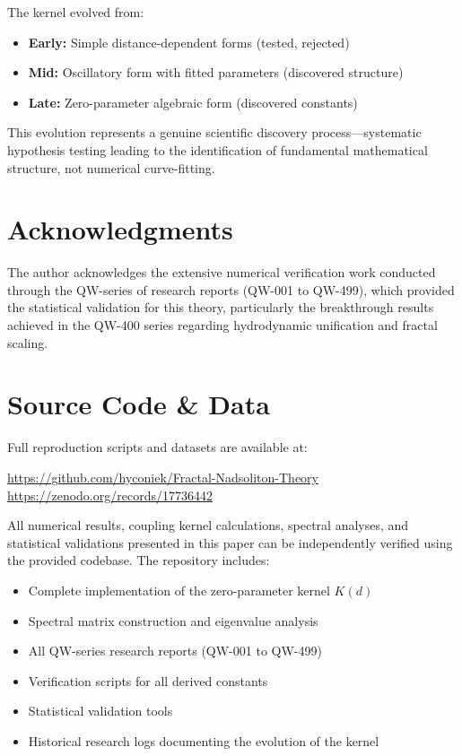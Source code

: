 \documentclass[11pt, a4paper]{article}
\begin{document}
The kernel evolved from:
\begin{itemize}
    \item \textbf{Early:} Simple distance-dependent forms (tested, rejected)
    \item \textbf{Mid:} Oscillatory form with fitted parameters (discovered structure)
    \item \textbf{Late:} Zero-parameter algebraic form (discovered constants)
\end{itemize}

This evolution represents a genuine scientific discovery process—systematic hypothesis testing leading to the identification of fundamental mathematical structure, not numerical curve-fitting.

\section*{Acknowledgments}

The author acknowledges the extensive numerical verification work conducted through the QW-series of research reports (QW-001 to QW-499), which provided the statistical validation for this theory, particularly the breakthrough results achieved in the QW-400 series regarding hydrodynamic unification and fractal scaling.

\section*{Source Code \& Data}

Full reproduction scripts and datasets are available at:

\url{https://github.com/hyconiek/Fractal-Nadsoliton-Theory}
\url{https://zenodo.org/records/17736442}

All numerical results, coupling kernel calculations, spectral analyses, and statistical validations presented in this paper can be independently verified using the provided codebase. The repository includes:
\begin{itemize}
    \item Complete implementation of the zero-parameter kernel $K(d)$
    \item Spectral matrix construction and eigenvalue analysis
    \item All QW-series research reports (QW-001 to QW-499)
    \item Verification scripts for all derived constants
    \item Statistical validation tools
    \item Historical research logs documenting the evolution of the kernel
\end{itemize}
\end{document}

